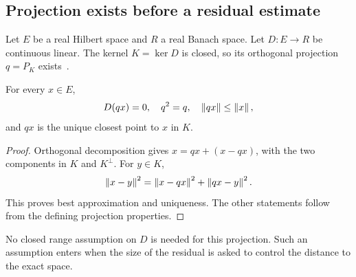 \label{sec:closed}
\subsection{Projection exists before a residual estimate}
Let \(E\) be a real Hilbert space and \(R\) a real Banach space. Let \(D:E\to R\) be continuous linear. The kernel \(K=\ker D\) is closed, so its orthogonal projection \(q=P_K\) exists~\cite{mathlib-projection}.

\begin{proposition}\label{KS42}
For every \(x\in E\),
\[
 D(qx)=0,\quad q^2=q,\quad\left\lVert qx\right\rVert\le\left\lVert x\right\rVert,
\]
and \(qx\) is the unique closest point to \(x\) in \(K\).
\end{proposition}
\begin{proof}
Orthogonal decomposition gives \(x=qx+(x-qx)\), with the two components in \(K\) and \(K^\perp\). For \(y\in K\),
\[
 \left\lVert x-y\right\rVert^2=\left\lVert x-qx\right\rVert^2+\left\lVert qx-y\right\rVert^2.
\]
This proves best approximation and uniqueness. The other statements follow from the defining projection properties.
\end{proof}
No closed range assumption on \(D\) is needed for this projection. Such an assumption enters when the size of the residual is asked to control the distance to the exact space.

